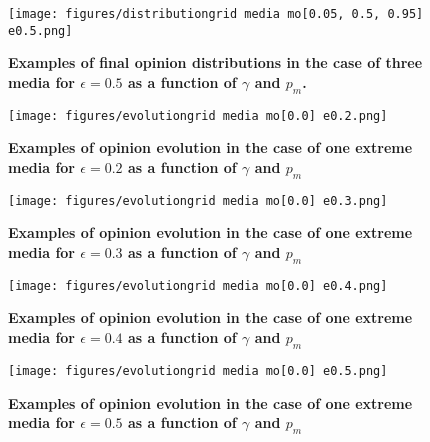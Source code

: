 \documentclass[10pt,letterpaper]{article}
\begin{document}
\begin{figure}
    \centering
    \texttt{[image: figures/distributiongrid media mo[0.05, 0.5, 0.95] e0.5.png]}
    \caption{\textbf{Examples of final opinion distributions in the case of three media for $\epsilon=0.5$ as a function of $\gamma$ and $p_m$.}}
    \label{fig:3mediafinaldisteps05}
\end{figure}

\begin{figure}
    \centering
    \texttt{[image: figures/evolutiongrid media mo[0.0] e0.2.png]}
    \caption{\textbf{Examples of opinion evolution in the case of one extreme media for $\epsilon=0.2$ as a function of $\gamma$ and $p_m$}}
    \label{fig:00evolutioneps02}
\end{figure}

\begin{figure}
    \centering
    \texttt{[image: figures/evolutiongrid media mo[0.0] e0.3.png]}
    \caption{\textbf{Examples of opinion evolution in the case of one extreme media for $\epsilon=0.3$ as a function of $\gamma$ and $p_m$}}
    \label{fig:00evolutioneps03}
\end{figure}

\begin{figure}
    \centering
    \texttt{[image: figures/evolutiongrid media mo[0.0] e0.4.png]}
    \caption{\textbf{Examples of opinion evolution in the case of one extreme media for $\epsilon=0.4$ as a function of $\gamma$ and $p_m$}}
    \label{fig:00evolutioneps04}
\end{figure}

\begin{figure}
    \centering
    \texttt{[image: figures/evolutiongrid media mo[0.0] e0.5.png]}
    \caption{\textbf{Examples of opinion evolution in the case of one extreme media for $\epsilon=0.5$ as a function of $\gamma$ and $p_m$}}
    \label{fig:00evolutioneps05}
\end{figure}
\end{document}
